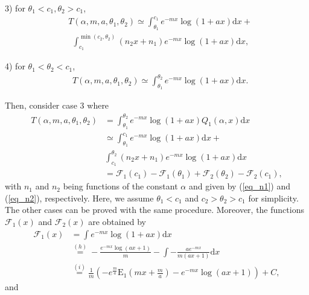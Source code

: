 3) for $\theta_1<c_1,\theta_2>c_1$,
\begin{align}
   & T(\alpha,m,a,\theta_1,\theta_2) \simeq \int_{\theta_1}^{c_1} e^{-mx}\log(1+ax)\text{d}x + \nonumber\\
   &~~ \int_{c_1}^{\min(c_2,\theta_2)} (n_2x+n_1)e^{-mx}\log(1+ax) \text{d}x,
\end{align}

4) for $\theta_1<\theta_2<c_1$,
\begin{align}
   & T(\alpha,m,a,\theta_1,\theta_2) \simeq \int_{\theta_1}^{\theta_2} e^{-mx}\log(1+ax)\text{d}x.
\end{align}

Then, consider case 3 where
\begin{align}
    T(\alpha,m,a,\theta_1,\theta_2) &= \int_{\theta_1}^{\theta_2} e^{-mx}\log(1+ax)Q_1(\alpha,x)\text{d}x\nonumber\\
    &\simeq \int_{\theta_1}^{c_1} e^{-mx}\log(1+ax)\text{d}x + \nonumber\\
   & \int_{c_1}^{\theta_2} (n_2x+n_1)e^{-mx}\log(1+ax) \text{d}x\nonumber\\
   & =  \mathcal{F}_1(c_1) -  \mathcal{F}_1(\theta_1) +  \mathcal{F}_2(\theta_2) -  \mathcal{F}_2(c_1),
\end{align}
with $n_1$ and $n_2$ being functions of the constant $\alpha$ and given by (\ref{eq_n1}) and (\ref{eq_n2}), respectively. Here, we assume $\theta_1<c_1$ and $c_2> \theta_2 > c_1$ for simplicity. The other cases can be proved with the same procedure. Moreover, the functions $\mathcal{F}_1(x)$ and $\mathcal{F}_2(x)$ are obtained by
\begin{align}
    \mathcal{F}_1(x) &= \int e^{-mx}\log(1+ax)\text{d}x\nonumber\\
    &\overset{(h)}= -\frac{e^{-mx}\log(ax+1)}{m}-\int -\frac{ae^{-mx}}{m(ax+1)} \text{d}x\nonumber\\
    & \overset{(i)}=  \frac{1}{m}\left(-e^{\frac{m}{a}}\operatorname{E_1}\left(mx+\frac{m}{a}\right)-e^{-mx}\log(ax+1)\right)+C,
\end{align}
and
